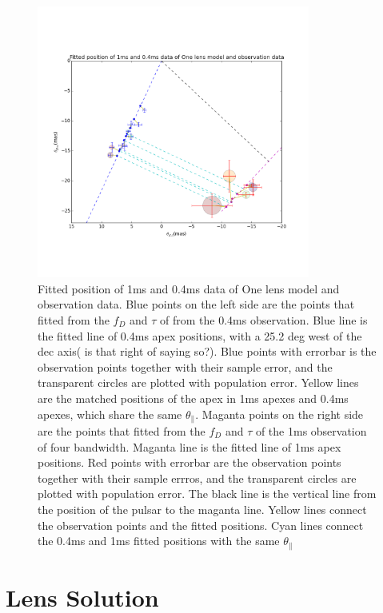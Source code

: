 \documentclass[useAMS,usenatbib]{mn2e}
\begin{document}
\begin{figure}
\centering
\includegraphics[width=0.8\textwidth, angle=0]{One_lens.png}
\caption{Fitted position of 1ms and 0.4ms data of One lens model and observation data. Blue points on the left side are the points that fitted from the $f_D$ and $\tau$ of from the 0.4ms observation. Blue line is the fitted line of 0.4ms apex positions, with a 25.2 deg west of the dec axis( is that right of saying so?). Blue points with errorbar is the observation points together with their sample error, and the transparent circles are plotted with population error. Yellow lines are the matched positions of the apex in 1ms apexes and 0.4ms apexes, which share the same $\theta_{\parallel}$. Maganta points on the right side are the points that fitted from the $f_D$ and $\tau$ of the 1ms observation of four bandwidth. Maganta line is the fitted line of 1ms apex positions. Red points with errorbar are the observation points together with their sample errros, and the transparent circles are plotted with population error. The black line is the vertical line from the position of the pulsar to the maganta line. Yellow lines connect the observation points and the fitted positions. Cyan lines connect the 0.4ms and 1ms fitted positions with the same $\theta_{\parallel}$ }\label{Onelens}
\end{figure}


\section{Lens Solution}
\end{document}
